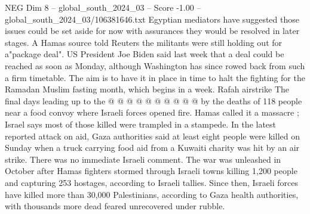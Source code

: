 \begin{textsample}{NEG Dim 8 – global\_south\_2024\_03 – Score -1.00 – global\_south\_2024\_03/106381646.txt}
Egyptian mediators have suggested those issues could be set aside for now with assurances they would be resolved in later stages.
A Hamas source told Reuters the militants were still holding out for a"package deal".
US President Joe Biden said last week that a deal could be reached as soon as Monday, although Washington has since rowed back from such a firm timetable.
The aim is to have it in place in time to halt the fighting for the Ramadan Muslim fasting month, which begins in a week.
Rafah airstrike The final days leading up to the @ @ @ @ @ @ @ @ @ @ by the deaths of 118 people near a food convoy where Israeli forces opened fire.
Hamas called it a massacre ; Israel says most of those killed were trampled in a stampede.
In the latest reported attack on aid, Gaza authorities said at least eight people were killed on Sunday when a truck carrying food aid from a Kuwaiti charity was hit by an air strike.
There was no immediate Israeli comment.
The war was unleashed in October after Hamas fighters stormed through Israeli towns killing 1,200 people and capturing 253 hostages, according to Israeli tallies.
Since then, Israeli forces have killed more than 30,000 Palestinians, according to Gaza health authorities, with thousands more dead feared unrecovered under rubble.

\end{textsample}
